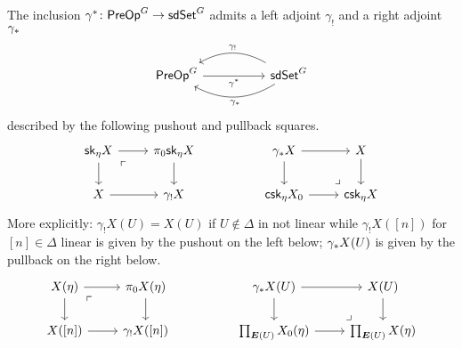 \documentclass[a4paper,10pt]{article}%
\numberwithin{equation}{section}
\numberwithin{figure}{section}
\theoremstyle{definition} %
\newcommand{\1}{\ensuremath{\mathbbm 1}}%
\begin{document}
The inclusion 
$\gamma^{\**} \colon \mathsf{PreOp}^G \to \mathsf{sdSet}^G$
admits a left adjoint $\gamma_!$
and a right adjoint $\gamma_{\**}$
\[
      \begin{tikzcd}[column sep =5em]
            \mathsf{PreOp}^G \ar{r}[swap]{\gamma^{\**}} 
            &
            \mathsf{sdSet}^G
            \ar[bend right]{l}[swap,midway]{\gamma_{!}}
            \ar[bend left]{l}{\gamma_{\**}}
      \end{tikzcd}
\]
described by the following pushout and pullback squares.
\begin{equation}\label{GAMMASTAR_EQ}
\begin{tikzcd}
	\mathsf{sk}_{\eta} X \ar{r} \ar{d} \arrow[dr, phantom, "\ulcorner", very near start]  
&
	\pi_0 \mathsf{sk}_{\eta} X \ar{d}
&& 
	\gamma_{\**}X \ar{r} \ar{d} 
&
	X \ar{d}
\\
	X \ar{r} 
&
	\gamma_! X 
&&
	\mathsf{csk}_{\eta} X_0
	\ar{r} 
&
	\mathsf{csk}_{\eta} X 
	\arrow[lu, phantom, "\lrcorner", very near start]
\end{tikzcd}
\end{equation}
More explicitly: 
$\gamma_{!}X (U) = X(U)$ if $U \not \in \Delta$
in not linear
while $\gamma_{!}X ([n])$ for $[n] \in \Delta$ linear is given by the pushout on the left below; 
$\gamma_{\**}X(U)$ is given by the pullback on the right below.
\begin{equation}\label{GAMMASTAR2_EQ}
      \begin{tikzcd}
            X(\eta) \ar{r} \ar{d} \arrow[dr, phantom, "\ulcorner", very near start]  &
            \pi_0 X(\eta) \ar{d}
            && 
            \gamma_{\**}X(U) \ar{r} \ar{d} & X(U) \ar{d}
            \\
            X([n]) \ar{r} & \gamma_! X([n]) 
            &&
            \prod_{\boldsymbol{E}(U)} X_0(\eta) \ar{r} &
            \prod_{\boldsymbol{E}(U)} X(\eta)
            \arrow[lu, phantom, "\lrcorner", very near start]
      \end{tikzcd}
\end{equation}


\end{document}
